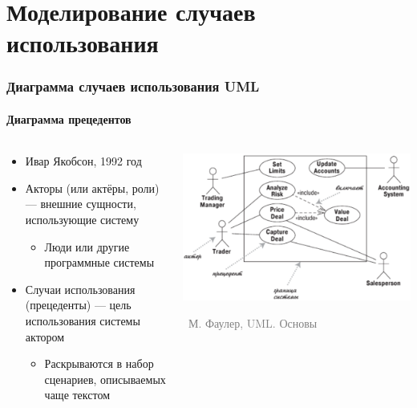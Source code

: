 \documentclass[xetex,mathserif,serif]{beamer}
\newcommand{\attribution}[1] {
	\vspace{-5mm}\begin{flushright}\begin{scriptsize}\textcolor{gray}{\textcopyright\, #1}\end{scriptsize}\end{flushright}
}
\begin{document}
	\section{Моделирование случаев использования}
	
	\begin{frame}
		\frametitle{Диаграмма случаев использования UML}
		\framesubtitle{Диаграмма прецедентов}
		\begin{columns}
			\begin{column}{0.5\textwidth}
				\begin{itemize}
					\item Ивар Якобсон, 1992 год
					\item Акторы (или актёры, роли) --- внешние сущности, использующие систему
					\begin{itemize}
						\item Люди или другие программные системы
					\end{itemize}
					\item Случаи использования (прецеденты)  --- цель использования системы актором
					\begin{itemize}
						\item Раскрываются в набор сценариев, описываемых чаще текстом
					\end{itemize}
				\end{itemize}
			\end{column}
			\begin{column}{0.5\textwidth}
				\begin{center}
					\includegraphics[width=\textwidth]{useCaseDiagram.png}
					\attribution{М. Фаулер, UML. Основы}
				\end{center}
			\end{column}
		\end{columns}
	\end{frame}
\end{document}
